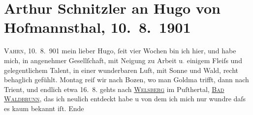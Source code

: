 

         
         \newcommand{\erwaehntePersonen}{Personen: Leopold von Andrian-Werburg, Hermann Bahr, Paul Goldmann, Hugo von Hofmannsthal, Gertrude von Hofmannsthal, Robert Michel, Olga Schnitzler}
         \newcommand{\erwaehnteOrte}{Orte: Bozen, Innsbruck, Schloss Weiherburg, Trient, Vahrn, Welsberg-Taisten, Wien, Wildbad Waldbrunn}
         \newcommand{\erwaehnteWerke}{Werke: Der einsame Weg. Schauspiel in fünf Akten, Die Frau mit dem Dolche, Lebendige Stunden, Literatur}
               \section[Arthur Schnitzler an Hugo von Hofmannsthal, 10. 8. 1901]{ Arthur Schnitzler an Hugo von Hofmannsthal,
                    10. 8. 1901}\nopagebreak{}\rehead{ }\begin{ledgroupsized}[t]{13cm}\normalsize\beginnumbering \toendnotes[C]{\smallbreak\pagebreak[2]} 
\toendnotes[C]{\smallbreak}\pstart
           \raggedleft{}{\pb}\textsc{Vahrn}, 10. 8. 901\pend
           \pstart
           mein lieber Hugo, ſeit vier Wochen bin ich hier, und habe mich,
                    in angenehmer Gesellſchaft, mit Neigung zu Arbeit u\textcolor{gray}{.} einigem
                    Fleiſs und gelegentlichem Talent, in einer wunderbaren Luft, mit Sonne und Wald,
                    recht behaglich gefühlt. Montag reiſ wir nach Bozen, wo man Goldma{\geminationn}
                    trifft, dann nach Trient, und endlich etwa
                        16. 8. gehts nach \uline{\textsc{Welsberg}} im Puſthertal, \uline{\textsc{Bad Waldbrunn}}, das ich neulich entdeckt habe u von dem ich mich nur wundre {\pb}daſs es kaum bekannt iſt. Ende

\end{ledgroupsized}
